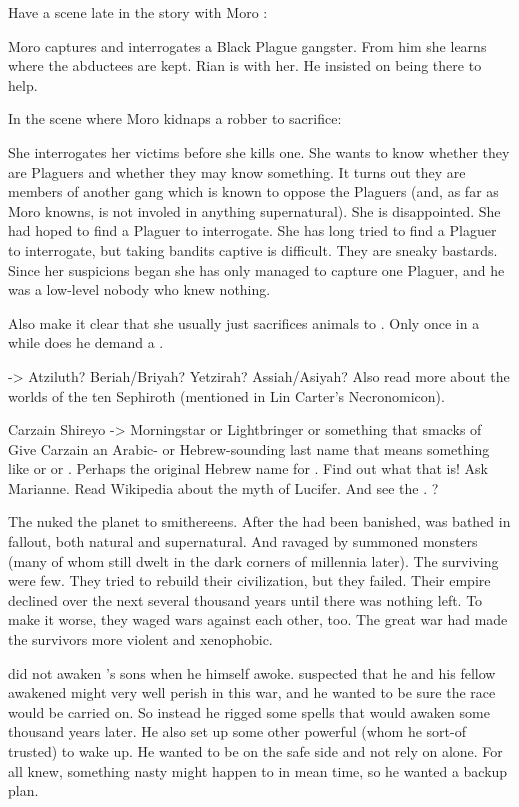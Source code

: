 Have a scene late in the story with Moro \Cornel:

  Moro captures and interrogates a Black Plague gangster.
  From him she learns where the abductees are kept. 
  Rian is with her.
  He insisted on being there to help.

In the scene where Moro kidnaps a robber to sacrifice:

  She interrogates her victims before she kills one.
  She wants to know whether they are Plaguers and whether they may know something.
  It turns out they are members of another gang which is known to oppose the Plaguers (and, as far as Moro knowns, is not involed in anything supernatural). 
  She is disappointed.
  She had hoped to find a Plaguer to interrogate.
  She has long tried to find a Plaguer to interrogate, but taking bandits captive is difficult. 
  They are sneaky bastards.
  Since her suspicions began she has only managed to capture one Plaguer, and he was a low-level nobody who knew nothing. 
  
  Also make it clear that she usually just sacrifices animals to \Nasshikerr. 
  Only once in a while does he demand a \humanoid.


\Miith -> Atziluth?
         Beriah/Briyah?
         Yetzirah?
         Assiah/Asiyah?
Also read more about the worlds of the ten Sephiroth (mentioned in Lin Carter's Necronomicon). 

Carzain Shireyo -> Morningstar or Lightbringer or something that smacks of 
Give Carzain an Arabic- or Hebrew-sounding last name that means something like  or  or .
Perhaps the original Hebrew name for . Find out what that is!
Ask Marianne.
Read Wikipedia about the myth of Lucifer.
And see the .
?


The \firstbanewar nuked the planet to smithereens. 
After the \banes had been banished, \Miith was bathed in fallout, both natural and supernatural. 
And ravaged by summoned monsters (many of whom still dwelt in the dark corners of \Miith millennia later). 
The surviving \ophidians were few. 
They tried to rebuild their civilization, but they failed. 
Their empire declined over the next several thousand years until there was nothing left. 
To make it worse, they waged wars against each other, too. 
The great war had made the survivors more violent and xenophobic. 



\Sethicus did not awaken \Tiamat's sons when he himself awoke. 
\Sethicus suspected that he and his fellow awakened \dragons might very well perish in this war, and he wanted to be sure the \draconian race would be carried on. 
So instead he rigged some spells that would awaken \Nexagglachel some thousand years later.
He also set up some other powerful \dragons (whom he sort-of trusted) to wake up. 
He wanted to be on the safe side and not rely on \Nexagglachel alone.
For all \Sethicus knew, something nasty might happen to \Nexagglachel in mean time, so he wanted a backup plan. 

